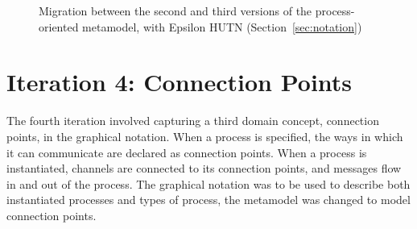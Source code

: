 \begin{figure}[htbp]
	\centering
	\caption{Migration between the second and third versions of the process-oriented metamodel, with Epsilon HUTN (Section~\ref{sec:notation})}
\end{figure}

\clearpage


\section{Iteration 4: Connection Points}
The fourth iteration involved capturing a third domain concept, connection points, in the graphical notation. When a process is specified, the ways in which it can communicate are declared as connection points. When a process is instantiated, channels are connected to its connection points, and messages flow in and out of the process. The graphical notation was to be used to describe both instantiated processes and types of process, the metamodel was changed to model connection points.

